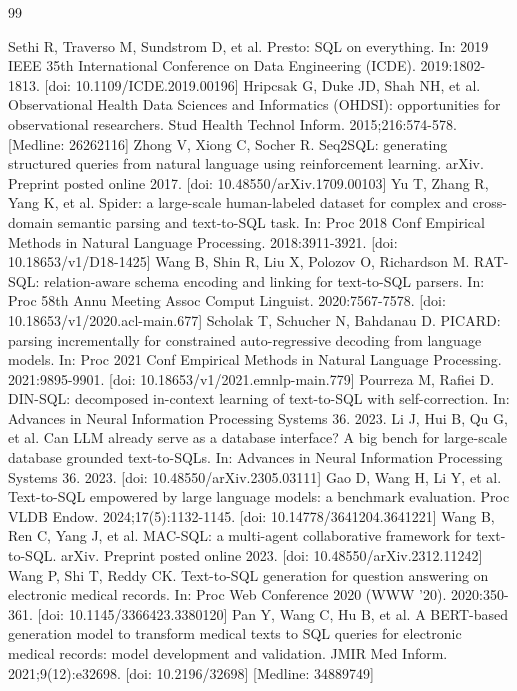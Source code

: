 \documentclass[10pt,twocolumn]{article}
\begin{document}
\begin{thebibliography}{99}\footnotesize

 Sethi R, Traverso M, Sundstrom D, et al. Presto: SQL on everything. In: 2019 IEEE 35th International Conference on Data Engineering (ICDE). 2019:1802-1813. [doi: 10.1109/ICDE.2019.00196]
 Hripcsak G, Duke JD, Shah NH, et al. Observational Health Data Sciences and Informatics (OHDSI): opportunities for observational researchers. Stud Health Technol Inform. 2015;216:574-578. [Medline: 26262116]
 Zhong V, Xiong C, Socher R. Seq2SQL: generating structured queries from natural language using reinforcement learning. arXiv. Preprint posted online 2017. [doi: 10.48550/arXiv.1709.00103]
 Yu T, Zhang R, Yang K, et al. Spider: a large-scale human-labeled dataset for complex and cross-domain semantic parsing and text-to-SQL task. In: Proc 2018 Conf Empirical Methods in Natural Language Processing. 2018:3911-3921. [doi: 10.18653/v1/D18-1425]
 Wang B, Shin R, Liu X, Polozov O, Richardson M. RAT-SQL: relation-aware schema encoding and linking for text-to-SQL parsers. In: Proc 58th Annu Meeting Assoc Comput Linguist. 2020:7567-7578. [doi: 10.18653/v1/2020.acl-main.677]
 Scholak T, Schucher N, Bahdanau D. PICARD: parsing incrementally for constrained auto-regressive decoding from language models. In: Proc 2021 Conf Empirical Methods in Natural Language Processing. 2021:9895-9901. [doi: 10.18653/v1/2021.emnlp-main.779]
 Pourreza M, Rafiei D. DIN-SQL: decomposed in-context learning of text-to-SQL with self-correction. In: Advances in Neural Information Processing Systems 36. 2023.
 Li J, Hui B, Qu G, et al. Can LLM already serve as a database interface? A big bench for large-scale database grounded text-to-SQLs. In: Advances in Neural Information Processing Systems 36. 2023. [doi: 10.48550/arXiv.2305.03111]
 Gao D, Wang H, Li Y, et al. Text-to-SQL empowered by large language models: a benchmark evaluation. Proc VLDB Endow. 2024;17(5):1132-1145. [doi: 10.14778/3641204.3641221]
 Wang B, Ren C, Yang J, et al. MAC-SQL: a multi-agent collaborative framework for text-to-SQL. arXiv. Preprint posted online 2023. [doi: 10.48550/arXiv.2312.11242]
 Wang P, Shi T, Reddy CK. Text-to-SQL generation for question answering on electronic medical records. In: Proc Web Conference 2020 (WWW '20). 2020:350-361. [doi: 10.1145/3366423.3380120]
 Pan Y, Wang C, Hu B, et al. A BERT-based generation model to transform medical texts to SQL queries for electronic medical records: model development and validation. JMIR Med Inform. 2021;9(12):e32698. [doi: 10.2196/32698] [Medline: 34889749]

\end{thebibliography}
\end{document}

